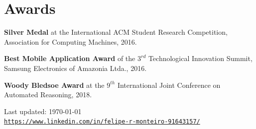 \documentclass[letterpaper]{article}
\def\footerlink{https://www.linkedin.com/in/felipe-r-monteiro-91643157/}
\renewenvironment{itemize}{
  \begin{list}{}{
    \setlength{\leftmargin}{1.5em}
  }
}{
  \end{list}
}
\begin{document}
\section*{Awards}
\begin{itemize}
  \item {\bf Silver Medal} at the International ACM Student Research Competition, Association for Computing Machines, 2016.

  \item {\bf Best Mobile Application Award} of the $3^{rd}$ Technological Innovation Summit, Samsung Electronics of Amazonia Ltda., 2016.
  
  \item {\bf Woody Bledsoe Award} at the $9^{th}$ International Joint Conference on Automated Reasoning, 2018.
\end{itemize}


%   

\bigskip

\begin{center}
  \begin{footnotesize}
    Last updated: \today \\
    \href{\footerlink}{\texttt{\footerlink}}
  \end{footnotesize}
\end{center}
\end{document}
